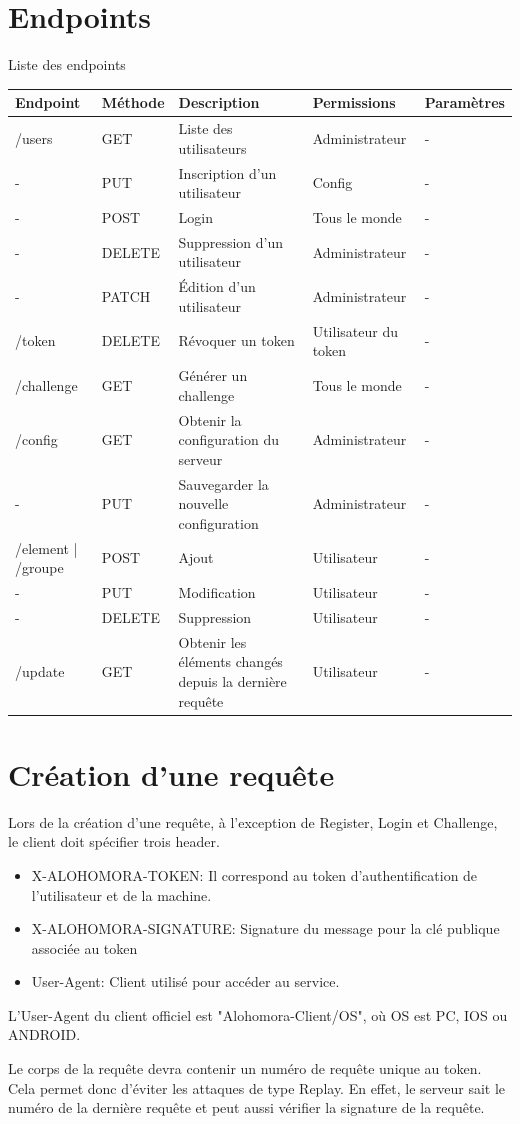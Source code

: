 \documentclass[oneside]{report}
\begin{document}
	\section{Endpoints}{
		\par Liste des endpoints
		\par
		\begin{tabu} to \textwidth {|X|X|X|X|X|}
			\hline
			Endpoint & Méthode & Description & Permissions & Paramètres \\
			\hline
			/users & GET & Liste des utilisateurs & Administrateur & - \\
			- & PUT & Inscription d'un utilisateur & Config & - \\
			- & POST & Login & Tous le monde & - \\
			- & DELETE & Suppression d'un utilisateur & Administrateur & - \\
			- & PATCH & Édition d'un utilisateur & Administrateur & - \\
			\hline
			/token & DELETE & Révoquer un token & Utilisateur du token & - \\
			\hline
			/challenge & GET & Générer un challenge & Tous le monde & - \\
			\hline
			/config & GET & Obtenir la configuration du serveur & Administrateur & - \\
			- & PUT & Sauvegarder la nouvelle configuration & Administrateur & - \\
			\hline
			/element | /groupe & POST & Ajout & Utilisateur & -\\
			- & PUT & Modification & Utilisateur & -\\
			- & DELETE & Suppression & Utilisateur & -\\
			\hline
			/update & GET & Obtenir les éléments changés depuis la dernière requête & Utilisateur & - \\
			\hline
		\end{tabu}
	}

	\section{Création d'une requête}{
		\par Lors de la création d'une requête, à l'exception de Register, Login et Challenge, le client doit spécifier trois header.
		\begin{itemize}
			\item X-ALOHOMORA-TOKEN: Il correspond au token d'authentification de l'utilisateur et de la machine.
			\item X-ALOHOMORA-SIGNATURE: Signature du message pour la clé publique associée au token
			\item User-Agent: Client utilisé pour accéder au service.
		\end{itemize}

		\par L'User-Agent du client officiel est "Alohomora-Client/{OS}", où OS est PC, IOS ou ANDROID.
		\par Le corps de la requête devra contenir un numéro de requête unique au token. Cela permet donc d'éviter les attaques de type Replay. En effet, le serveur sait le numéro de la dernière requête et peut aussi vérifier la signature de la requête.
	}
\end{document}

